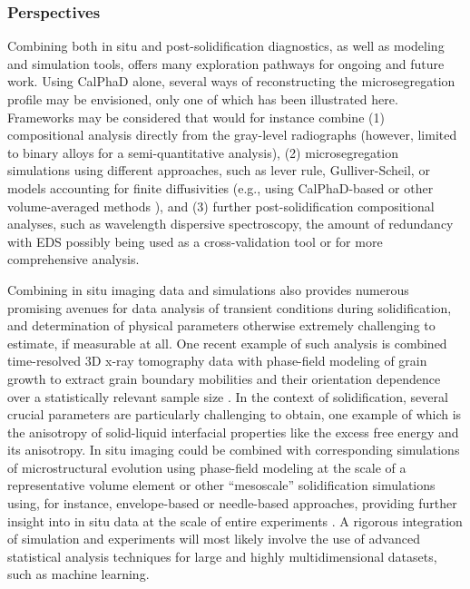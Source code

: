 \subsubsection{Perspectives}
Combining both in situ and post-solidification diagnostics, as well as
modeling and simulation tools, offers many exploration pathways for
ongoing and future work. Using CalPhaD alone, several ways of
reconstructing the microsegregation profile may be envisioned, only one of
which has been illustrated here. Frameworks may be considered that would
for instance combine (1) compositional analysis directly from the
gray-level radiographs
\cite{Ruvalcaba2007,Bogno2011,Bogno2013,Becker2016a,Becker2020,Mirihanage2014}
(however, limited to binary alloys
for a semi-quantitative analysis), (2) microsegregation simulations using
different approaches, such as lever rule, Gulliver-Scheil, or models
accounting for finite diffusivities (e.g., using CalPhaD-based or other
volume-averaged methods \cite{Tourret2009}), and
(3) further post-solidification
compositional analyses, such as wavelength dispersive spectroscopy, the
amount of redundancy with EDS possibly being used as a cross-validation
tool or for more comprehensive analysis.

Combining in situ imaging data and simulations also provides numerous
promising avenues for data analysis of transient conditions during
solidification, and determination of physical parameters otherwise
extremely challenging to estimate, if measurable at all. One recent
example of such analysis is combined time-resolved 3D x-ray tomography
data with phase-field modeling of grain growth to extract grain boundary
mobilities and their orientation dependence over a statistically relevant
sample size \cite{Zhang2020}.
In the context of solidification, several crucial
parameters are particularly challenging to obtain, one example of which is
the anisotropy of solid-liquid interfacial properties like the excess free
energy and its anisotropy. In situ imaging could be combined with
corresponding simulations of microstructural evolution using phase-field
modeling at the scale of a representative volume element \cite{Mitsuyama2020}
or other ``mesoscale'' solidification simulations using, for instance,
envelope-based or needle-based approaches, providing further insight into
in situ data at the scale of entire experiments
\cite{Becker2020,Olmedilla2019}. A rigorous
integration of simulation and experiments will most likely involve the use
of advanced statistical analysis techniques for large and highly
multidimensional datasets, such as machine learning.

